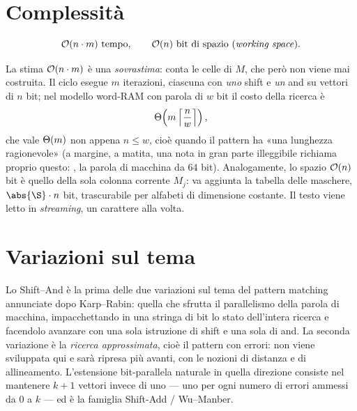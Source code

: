 \section{Complessità}

\[
  \mathcal{O}(n\cdot m)\ \text{tempo},\qquad \mathcal{O}(n)\ \text{bit di spazio (\emph{working space})} .
\]

\begin{osservazione}
La stima $\mathcal{O}(n\cdot m)$ è una \emph{sovrastima}: conta le celle di $M$, che però non viene mai
costruita. Il ciclo esegue $m$ iterazioni, ciascuna con \emph{uno} shift e \emph{un} and su
vettori di $n$ bit; nel modello word-RAM con parola di $w$ bit il costo della ricerca è
\[
  \Theta\!\left(m\left\lceil \frac{n}{w}\right\rceil\right),
\]
che vale $\Theta(m)$ non appena $n\le w$, cioè quando il pattern ha «una lunghezza ragionevole»
(a margine, a matita, una nota in gran parte illeggibile richiama proprio questo:
, la parola di macchina da $64$ bit).
Analogamente, lo spazio $\mathcal{O}(n)$ bit è quello della sola colonna corrente $M_j$: va aggiunta la
tabella delle maschere, $\abs{\alfa}\cdot n$ bit, trascurabile per alfabeti di dimensione
costante. Il testo viene letto in \emph{streaming}, un carattere alla volta.
\end{osservazione}


\section{Variazioni sul tema}

Lo Shift--And è la prima delle due variazioni sul tema del pattern matching annunciate dopo
Karp--Rabin: quella che sfrutta il parallelismo della parola di macchina, impacchettando in una
stringa di bit lo stato dell'intera ricerca e facendolo avanzare con una sola istruzione di shift
e una sola di and. La seconda variazione è la \emph{ricerca approssimata}, cioè il pattern con
errori: non viene sviluppata qui e sarà ripresa più avanti, con le nozioni di distanza e di
allineamento. L'estensione bit-parallela naturale in quella direzione consiste nel mantenere
$k+1$ vettori invece di uno --- uno per ogni numero di errori ammessi da $0$ a $k$ --- ed è la
famiglia Shift-Add / Wu--Manber.

